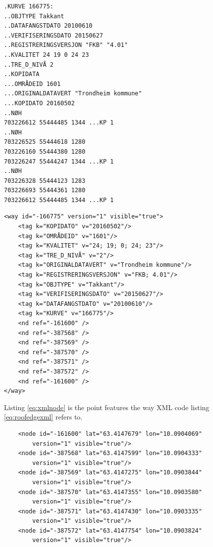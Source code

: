 \begin{lstlisting}
.KURVE 166775:
..OBJTYPE Takkant
..DATAFANGSTDATO 20100610
..VERIFISERINGSDATO 20150627
..REGISTRERINGSVERSJON "FKB" "4.01"
..KVALITET 24 19 0 24 23
..TRE_D_NIVÅ 2
..KOPIDATA
...OMRÅDEID 1601
...ORIGINALDATAVERT "Trondheim kommune"
...KOPIDATO 20160502
..NØH
703226612 55444485 1344 ...KP 1
..NØH
703226525 55444618 1280
703226160 55444380 1280
703226247 55444247 1344 ...KP 1
..NØH
703226328 55444123 1283
703226693 55444361 1280
703226612 55444485 1344 ...KP 1
\end{lstlisting}
 

\begin{lstlisting}
<way id="-166775" version="1" visible="true">
	<tag k="KOPIDATO" v="20160502"/>
	<tag k="OMRÅDEID" v="1601"/>
	<tag k="KVALITET" v="24; 19; 0; 24; 23"/>
	<tag k="TRE_D_NIVÅ" v="2"/>
	<tag k="ORIGINALDATAVERT" v="Trondheim kommune"/>
	<tag k="REGISTRERINGSVERSJON" v="FKB; 4.01"/>
	<tag k="OBJTYPE" v="Takkant"/>
	<tag k="VERIFISERINGSDATO" v="20150627"/>
	<tag k="DATAFANGSTDATO" v="20100610"/>
	<tag k="KURVE" v="166775"/>
	<nd ref="-161600" />
	<nd ref="-387568" />
	<nd ref="-387569" />
	<nd ref="-387570" />
	<nd ref="-387571" />
	<nd ref="-387572" />
	<nd ref="-161600" />
</way>
\end{lstlisting}

Listing \ref{eq:xmlnode} is the point features the way XML code listing \ref{eq:roofedgexml} refers to. 

\begin{lstlisting}
	<node id="-161600" lat="63.4147679" lon="10.0904069" 
		version="1" visible="true"/>
	<node id="-387568" lat="63.4147599" lon="10.0904333" 
		version="1" visible="true"/>
	<node id="-387569" lat="63.4147275" lon="10.0903844" 
		version="1" visible="true"/>
	<node id="-387570" lat="63.4147355" lon="10.0903580" 
		version="1" visible="true"/>
	<node id="-387571" lat="63.4147430" lon="10.0903335" 
		version="1" visible="true"/>
	<node id="-387572" lat="63.4147754" lon="10.0903824" 
		version="1" visible="true"/>
\end{lstlisting}

